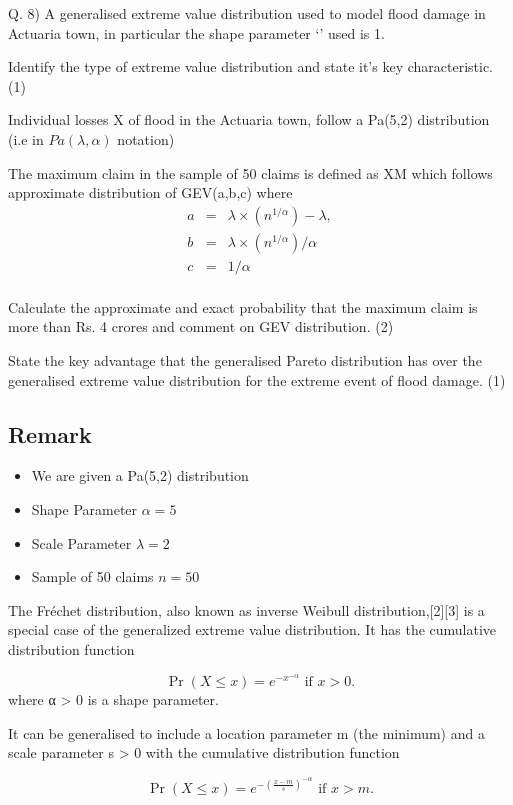 Q. 8)
A generalised extreme value distribution used to model flood damage in Actuaria town, in particular the shape parameter ‘\gamma’ used is 1.
\item Identify the type of extreme value distribution and state it’s key characteristic.
(1)
\item Individual losses X of flood in the Actuaria town, follow a Pa(5,2) distribution (i.e  in $Pa(\lambda,\alpha)$ notation)

The maximum claim in the sample of 50 claims is defined as XM which follows approximate distribution of GEV(a,b,c) where 
\begin{eqnarray*}
a &=& \lambda \times (n^{1/\alpha}) -\lambda,\\ 
b &=& \lambda \times (n^{1/\alpha}) /\alpha  \\  
c &=& 1/\alpha \\
\end{eqnarray*}

Calculate the approximate and exact probability that the maximum claim is more than Rs. 4 crores and comment on GEV distribution.
(2)
\item State the key advantage that the generalised Pareto distribution has over the generalised extreme value distribution for the extreme event of flood damage.
(1)

\subsection*{Remark}
\begin{itemize}
\item We are given a Pa(5,2) distribution
\item Shape Parameter $\alpha = 5$
\item Scale Parameter $\lambda = 2$
\item Sample of 50 claims $n=50$
\end{itemize}


\begin{framed}
The Fréchet distribution, also known as inverse Weibull distribution,[2][3] is a special case of the generalized extreme value distribution. 
It has the cumulative distribution function


$${\displaystyle \Pr(X\leq x)=e^{-x^{-\alpha }}{\text{ if }}x>0.}$$
where α > 0 is a shape parameter. 

It can be generalised to include a location parameter m (the minimum) and a scale parameter s > 0 with the cumulative distribution function


$${\displaystyle \Pr(X\leq x)=e^{-\left({\frac {x-m}{s}}\right)^{-\alpha }}{\text{ if }}x>m.}$$

\end{framed}
\newpage


